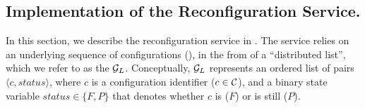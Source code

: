  
%




\subsection{Implementation of the Reconfiguration Service.}
\label{ssec:recbox} 
In this section, we describe the reconfiguration service in \ares{}.
The service relies on an underlying sequence of configurations (), 
in the from of a  ``distributed list'', which we refer to as the  ${\mathcal{G}_L}$. 
Conceptually, ${\mathcal{G}_L}$ represents
an ordered list of pairs $\langle c, status \rangle$, where $c$ is a configuration identifier ($ c \in \mathcal{C}$),  
 and a binary state variable $status \in \{F, P\}$
that denotes whether $c$ is  ($F$) or is still  ($P$). 

